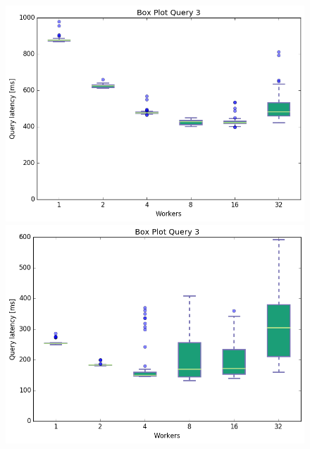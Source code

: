 \documentclass[11pt,singlecolumn]{scrartcl}
\begin{document}
\begin{figure}[!tbp]
  \centering
  \RawFloats
  \begin{minipage}[b]{0.5\textwidth}
    \includegraphics[width=\textwidth]{boxesfl/q3}
  \end{minipage}
  \hfill
  \begin{minipage}[b]{0.5\textwidth}
    \includegraphics[width=\textwidth]{boxesfs/q3}
  \end{minipage}
\end{figure}
\end{document}
